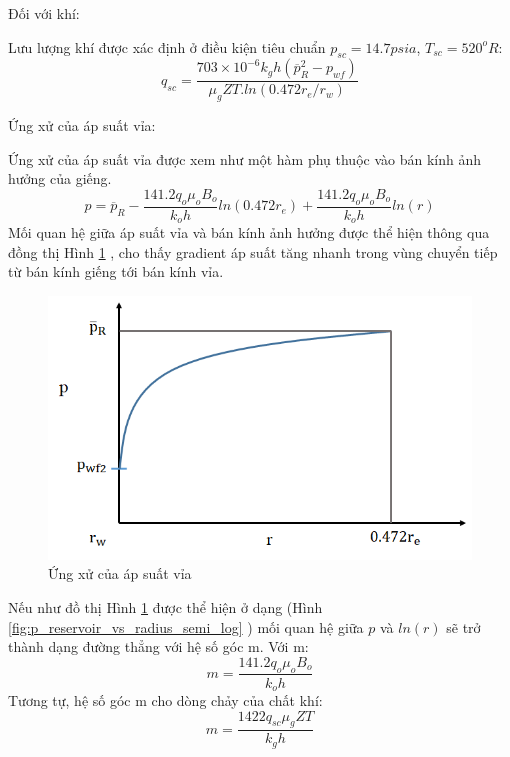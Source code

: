 \documentclass[12pt,a4paper]{report}
\begin{document}
Đối với khí:

Lưu lượng khí được xác định ở điều kiện tiêu chuẩn $p_{sc} = 14.7 psia$, $T_{sc}=520^oR$:
	\begin{equation}
		q_{sc}=\dfrac{703\times 10^{-6}k_gh(\overline p_R^2-p_{wf})}{\mu_gZT.ln(0.472r_e/r_w)}
	\end{equation}

Ứng xử của áp suất vỉa:

Ứng xử của áp suất vỉa được xem như một hàm phụ thuộc vào bán kính ảnh hưởng của giếng.
	\begin{equation}
		p = \overline p_R - \dfrac{141.2q_o\mu_oB_o}{k_oh}ln(0.472r_e)
		+\dfrac{141.2q_o\mu_oB_o}{k_oh}ln(r)
	\end{equation}
Mối quan hệ giữa áp suất vỉa và bán kính ảnh hưởng được thể hiện thông qua đồng thị Hình \ref{fig:p_reservoir_vs_radius} \cite{dale1991production}, cho thấy gradient áp suất tăng nhanh trong vùng chuyển tiếp từ bán kính giếng tới bán kính vỉa.
	\begin{figure}[h]
		\centering
		\includegraphics[scale=0.75]{Fig/p_reservoir_vs_radius.png}
		\caption{Ứng xử của áp suất vỉa}
		\label{fig:p_reservoir_vs_radius}
	\end{figure}
\newline
Nếu như đồ thị Hình \ref{fig:p_reservoir_vs_radius} được thể hiện ở dạng  (Hình \ref{fig:p_reservoir_vs_radius_semi_log} \cite{dale1991production}) mối quan hệ giữa $p$ và $ln(r)$ sẽ trở thành dạng đường thẳng với hệ số góc m. Với m:
	\begin{equation}
		m = \dfrac{141.2q_o\mu_oB_o}{k_oh}
	\end{equation}
Tương tự, hệ số góc m cho dòng chảy của chất khí:
	\begin{equation}
		m = \dfrac{1422q_{sc}\mu_gZT}{k_gh}
	\end{equation}
\end{document}

